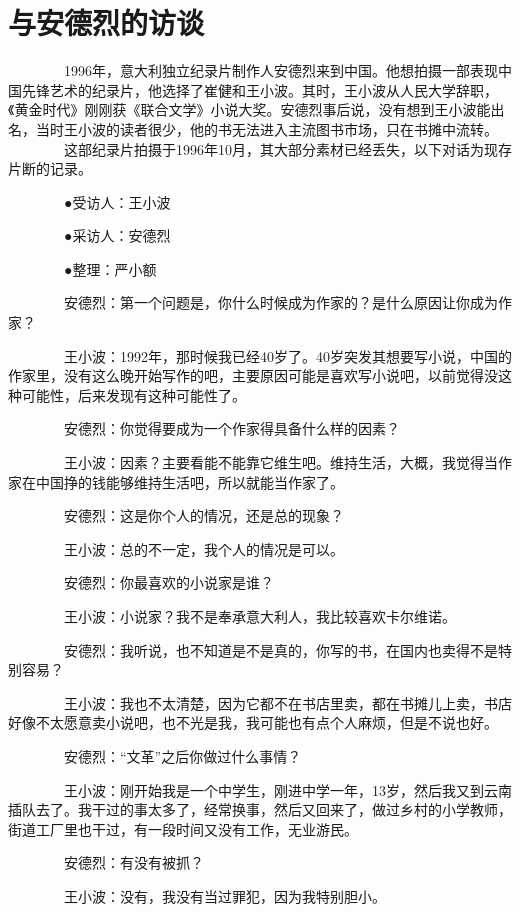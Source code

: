 \chapter{与安德烈的访谈}

　　　　1996年，意大利独立纪录片制作人安德烈来到中国。他想拍摄一部表现中国先锋艺术的纪录片，他选择了崔健和王小波。其时，王小波从人民大学辞职，《黄金时代》刚刚获《联合文学》小说大奖。安德烈事后说，没有想到王小波能出名，当时王小波的读者很少，他的书无法进入主流图书市场，只在书摊中流转。 
　　　　这部纪录片拍摄于1996年10月，其大部分素材已经丢失，以下对话为现存片断的记录。 

　　　　●受访人：王小波 

　　　　●采访人：安德烈 

　　　　●整理：严小额 

　　　　安德烈：第一个问题是，你什么时候成为作家的？是什么原因让你成为作家？ 

　　　　王小波：1992年，那时候我已经40岁了。40岁突发其想要写小说，中国的作家里，没有这么晚开始写作的吧，主要原因可能是喜欢写小说吧，以前觉得没这种可能性，后来发现有这种可能性了。 

　　　　安德烈：你觉得要成为一个作家得具备什么样的因素？ 

　　　　王小波：因素？主要看能不能靠它维生吧。维持生活，大概，我觉得当作家在中国挣的钱能够维持生活吧，所以就能当作家了。 

　　　　安德烈：这是你个人的情况，还是总的现象？ 

　　　　王小波：总的不一定，我个人的情况是可以。 

　　　　安德烈：你最喜欢的小说家是谁？ 

　　　　王小波：小说家？我不是奉承意大利人，我比较喜欢卡尔维诺。 

　　　　安德烈：我听说，也不知道是不是真的，你写的书，在国内也卖得不是特别容易？ 

　　　　王小波：我也不太清楚，因为它都不在书店里卖，都在书摊儿上卖，书店好像不太愿意卖小说吧，也不光是我，我可能也有点个人麻烦，但是不说也好。 

　　　　安德烈：“文革”之后你做过什么事情？ 

　　　　王小波：刚开始我是一个中学生，刚进中学一年，13岁，然后我又到云南插队去了。我干过的事太多了，经常换事，然后又回来了，做过乡村的小学教师，街道工厂里也干过，有一段时间又没有工作，无业游民。 

　　　　安德烈：有没有被抓？ 

　　　　王小波：没有，我没有当过罪犯，因为我特别胆小。 

